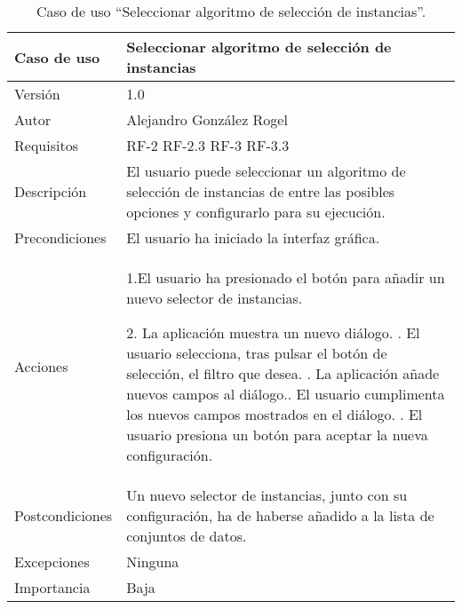  
   \begin{table}
  \begin{center}
   \begin{tabular}{|>{} L{3cm} | L{9cm} |}
    \hline
    Caso de uso & Seleccionar algoritmo de selección de instancias\\
    \hline
    Versión & 1.0 \\
    \hline
    Autor & Alejandro González Rogel \\
    \hline
    Requisitos & RF-2\newline
    				 RF-2.3\newline
    				 RF-3\newline
    				 RF-3.3 \\
    \hline
    Descripción & El usuario puede seleccionar un algoritmo de selección de instancias de entre las posibles opciones y configurarlo para su ejecución. \\
    \hline
    Precondiciones & El usuario ha iniciado la interfaz gráfica.\\
    \hline
    		Acciones & 1.El usuario ha presionado el botón para añadir un nuevo selector de instancias.  \newline
    		
    		2. La aplicación muestra un nuevo diálogo. . El usuario selecciona, tras pulsar el botón de selección, el filtro que desea. . La aplicación añade nuevos campos al diálogo.. El usuario cumplimenta los nuevos campos mostrados en el diálogo. . El usuario presiona un botón para aceptar la nueva configuración. \\
    \hline
    Postcondiciones & Un nuevo selector de instancias, junto con su configuración, ha de haberse añadido a la lista de conjuntos de datos. \\
    \hline
    Excepciones & Ninguna \\
    \hline
    Importancia & Baja \\
    \hline
   \end{tabular}
   \caption{Caso de uso ``Seleccionar algoritmo de selección de instancias''.}
   \label{tabla:casoUso7}
  \end{center}
 \end{table}
 
